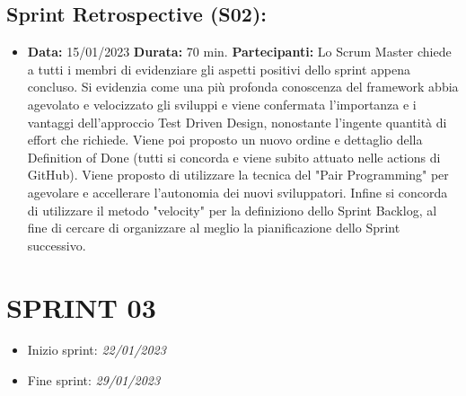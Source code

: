 \begin{landscape}
\begin{itemize}
        \end{itemize}
        \newpage
        \subsection{Sprint Retrospective (S02):}
        \begin{itemize}
            \item \textbf{Data:} 15/01/2023
            \newline \textbf{Durata:} 70 min.
            \newline \textbf{Partecipanti:}  \dueP \due
            \newline
            \newline Lo Scrum Master chiede a tutti i membri di evidenziare gli aspetti positivi dello sprint appena concluso. Si evidenzia come una più profonda conoscenza del framework abbia agevolato e velocizzato gli sviluppi e viene confermata l'importanza e i vantaggi dell'approccio Test Driven Design, nonostante l'ingente quantità di effort che richiede. Viene poi proposto un nuovo ordine e dettaglio della Definition of Done (tutti si concorda e viene subito attuato nelle actions di GitHub). Viene proposto di utilizzare la tecnica del "Pair Programming" per agevolare e accellerare l'autonomia dei nuovi sviluppatori. Infine si concorda di utilizzare il metodo "velocity" per la definiziono dello Sprint Backlog, al fine di cercare di organizzare al meglio la pianificazione dello Sprint successivo.
        \end{itemize}

        \newpage

        \section{SPRINT 03}

        \begin{itemize}
            \item Inizio sprint: \textit{22/01/2023}
            \item Fine sprint: \textit{29/01/2023}
        \end{itemize}


\end{landscape}
